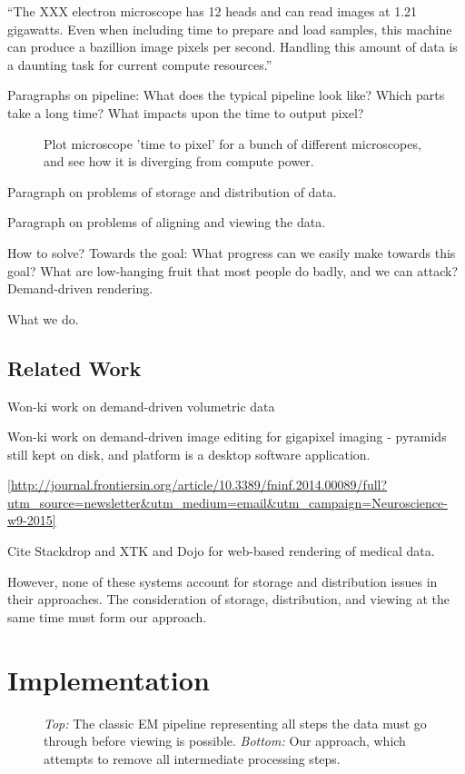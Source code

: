 \documentclass{llncs}
\begin{document}
``The XXX electron microscope has 12 heads and can read images at 1.21 gigawatts. Even when including time to prepare and load samples, this machine can produce a bazillion image pixels per second. Handling this amount of data is a daunting task for current compute resources.''

Paragraphs on pipeline: What does the typical pipeline look like? Which parts take a long time? What impacts upon the time to output pixel?


\begin{figure}
\caption{Plot microscope 'time to pixel' for a bunch of different microscopes, and see how it is diverging from compute power.}
\end{figure}


Paragraph on problems of storage and distribution of data.

Paragraph on problems of aligning and viewing the data.

How to solve? Towards the goal: What progress can we easily make towards this goal? What are low-hanging fruit that most people do badly, and we can attack? Demand-driven rendering.

What we do.

%
%
\subsection{Related Work}
Won-ki work on demand-driven volumetric data

Won-ki work on demand-driven image editing for gigapixel imaging - pyramids still kept on disk, and platform is a desktop software application.

\ref{http://journal.frontiersin.org/article/10.3389/fninf.2014.00089/full?utm_source=newsletter&utm_medium=email&utm_campaign=Neuroscience-w9-2015}

Cite Stackdrop and XTK and Dojo for web-based rendering of medical data.

However, none of these systems account for storage and distribution issues in their approaches. The consideration of storage, distribution, and viewing at the same time must form our approach.
%

\section{Implementation}

\begin{figure}
\caption{\emph{Top:} The classic EM pipeline representing all steps the data must go through before viewing is possible. \emph{Bottom:} Our approach, which attempts to remove all intermediate processing steps.}
\end{figure}
\end{document}
